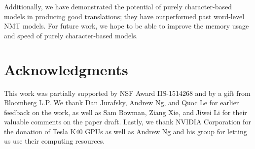 \documentclass[11pt]{article}
\begin{document}
Additionally, we have demonstrated the potential of purely character-based
models in producing good translations;
they have outperformed past word-level NMT models. For future work, we hope to be able to improve the memory usage and
speed of purely character-based models.

\section*{Acknowledgments}
This work was partially supported by NSF Award IIS-1514268 and by a gift from Bloomberg L.P.
We thank Dan Jurafsky, Andrew Ng, and Quoc Le for earlier feedback on the work,
as well as Sam Bowman, Ziang Xie, and Jiwei Li for their valuable comments on
the paper draft.
Lastly, we thank NVIDIA Corporation for the donation of
Tesla K40 GPUs as well as Andrew Ng and his group for letting us use their computing
resources.



\end{document}
